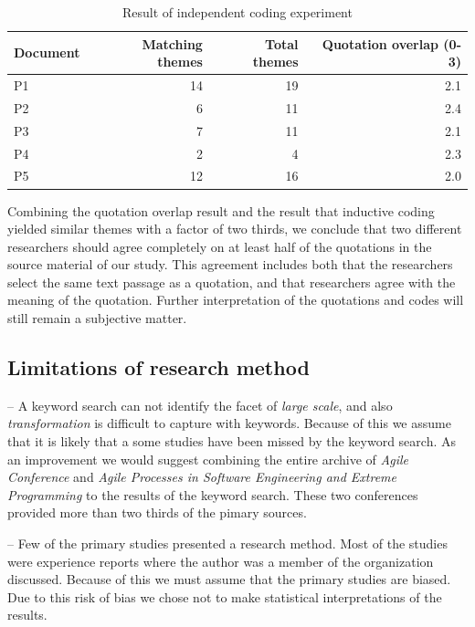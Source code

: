 \documentclass[preprint,authoryear,12pt]{elsarticle}
\begin{document}
\begin{table}
    \begin{tabular}{ l r r r }
        \toprule
        Document    &  Matching themes  &  Total themes  &  Quotation overlap (0-3) \\
        \midrule
        P1          &  14  &  19   &  2.1  \\
        P2          &   6  &  11   &  2.4  \\
        P3          &   7  &  11   &  2.1  \\
        P4          &   2  &   4   &  2.3  \\
        P5          &  12  &  16   &  2.0  \\
        \bottomrule
    \end{tabular}
    \caption{Result of independent coding experiment}
    \label{table:codingexperiment}
\end{table}

Combining the quotation overlap result and the result that inductive coding
yielded similar themes with a factor of two thirds, we conclude that two
different researchers should agree completely on at least half of the quotations
in the source material of our study. This agreement includes both that the
researchers select the same text passage as a quotation, and that researchers
agree with the meaning of the quotation. Further interpretation of the
quotations and codes will still remain a subjective matter.


\subsection{Limitations of research method}

-- A keyword search can not identify the facet of \emph{large scale}, and also
   \emph{transformation} is difficult to capture with keywords. Because of this
   we assume that it is likely that a some studies have been missed by the
   keyword search. As an improvement we would suggest combining the entire
   archive of \emph{Agile Conference} and \emph{Agile Processes in Software
   Engineering and Extreme Programming} to the results of the keyword search.
   These two conferences provided more than two thirds of the pimary sources.

-- Few of the primary studies presented a research method. Most of the studies
   were experience reports where the author was a member of the organization
   discussed. Because of this we must assume that the primary studies are
   biased. Due to this risk of bias we chose not to make statistical
   interpretations of the results.
\end{document}
